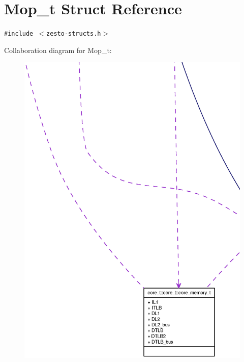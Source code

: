 \section{Mop\_\-t Struct Reference}
\label{structMop__t}
{\tt \#include $<$zesto-structs.h$>$}

Collaboration diagram for Mop\_\-t:\nopagebreak
\begin{figure}[H]
\begin{center}
\leavevmode
\includegraphics[width=400pt]{structMop__t__coll__graph}
\end{center}
\end{figure}
